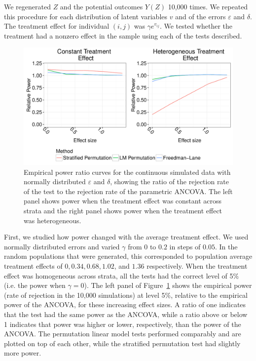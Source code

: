 \documentclass[12pt]{article}
\begin{document}
We regenerated $Z$ and the potential outcomes $Y(Z)$ 10,000 times.
We repeated this procedure for each distribution of latent variables $v$ and of the errors $\varepsilon$ and $\delta$.
The treatment effect for individual $(i, j)$ was $\gamma e^{v_{ij}}$.
We tested whether the treatment had a nonzero effect in the sample using each of the tests described.

\begin{figure}[h]
\centering
\includegraphics[width = \textwidth]{fig/continuous_outcomes_simulation_power.pdf}
\caption{Empirical power ratio curves for the continuous simulated data with normally distributed $\varepsilon$ and $\delta$, showing the ratio of the rejection rate of the test to the rejection rate of the parametric ANCOVA. The left panel shows power when the treatment effect was constant across strata and the right panel shows power when the treatment effect was heterogeneous.}
\label{fig:continuous_outcomes_sim_power}
\end{figure}

First, we studied how power changed with the average treatment effect.
We used normally distributed errors and varied $\gamma$ from $0$ to $0.2$ in steps of $0.05$.
In the random populations that were generated, this corresponded to population average treatment effects of $0, 0.34, 0.68, 1.02$, and $1.36$ respectively.
When the treatment effect was homogeneous across strata, all the tests had the correct level of 5\% (i.e. the power when $\gamma = 0$).
The left panel of Figure~\ref{fig:continuous_outcomes_sim_power} shows the empirical power (rate of rejection in the 10,000 simulations) at level 5\%, relative to the empirical power of the ANCOVA, for these increasing effect sizes.
A ratio of one indicates that the test had the same power as the ANCOVA, while a ratio above or below 1 indicates that power was higher or lower, respectively, than the power of the ANCOVA.
The permutation linear model tests performed comparably and are plotted on top of each other, while the stratified permutation test had slightly more power.
\end{document}
